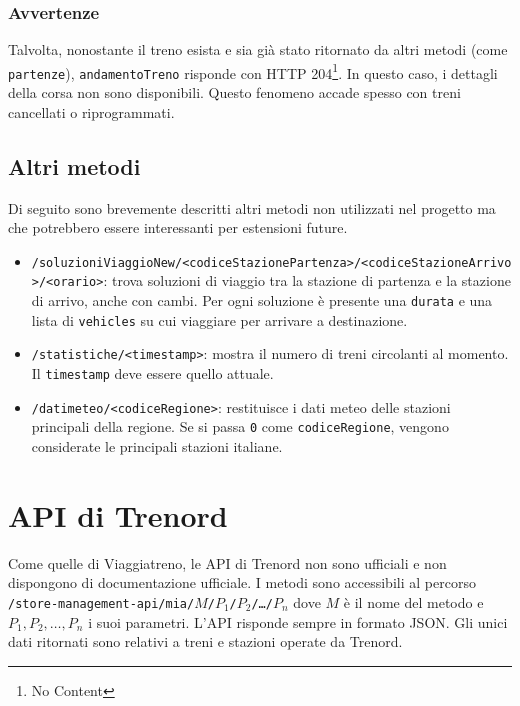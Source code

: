 \documentclass[12pt,italian]{report}
\begin{document}
\subsubsection{Avvertenze}

Talvolta, nonostante il treno esista e sia già stato ritornato da
altri metodi (come \texttt{partenze}), \texttt{andamentoTreno}
risponde con HTTP 204\footnote{No Content}.  In questo caso, i
dettagli della corsa non sono disponibili.  Questo fenomeno accade
spesso con treni cancellati o riprogrammati.

\subsection{Altri metodi}

Di seguito sono brevemente descritti altri metodi non utilizzati nel
progetto ma che potrebbero essere interessanti per estensioni future.

\begin{itemize}
    \item
    \texttt{/soluzioniViaggioNew/\-<codiceStazionePartenza>/\-<codiceStazioneArrivo>/\-<orario>}:
    trova soluzioni di viaggio tra la stazione di partenza e la
    stazione di arrivo, anche con cambi.  Per ogni soluzione è
    presente una \texttt{durata} e una lista di \texttt{vehicles} su
    cui viaggiare per arrivare a destinazione.
    \item \texttt{/statistiche/<timestamp>}: mostra il numero di treni
    circolanti al momento. Il \texttt{timestamp} deve essere quello
    attuale.
    \item \texttt{/datimeteo/\-<codiceRegione>}: restituisce i dati
    meteo delle stazioni principali della regione. Se si passa
    \texttt{0} come \texttt{codiceRegione}, vengono considerate le
    principali stazioni italiane.
\end{itemize}

\section{API di Trenord}

Come quelle di Viaggiatreno, le API di Trenord non sono ufficiali e
non dispongono di documentazione ufficiale.  I metodi sono accessibili
al percorso
\texttt{/\-store-management-api/\-mia/\-$M$/\-$P_1$/\-$P_2$/\-\dots/\-$P_n$}
dove $M$ è il nome del metodo e $P_1, P_2, \dots, P_n$ i suoi
parametri.  L'API risponde sempre in formato JSON\@.  Gli unici dati
ritornati sono relativi a treni e stazioni operate da Trenord.
\end{document}
